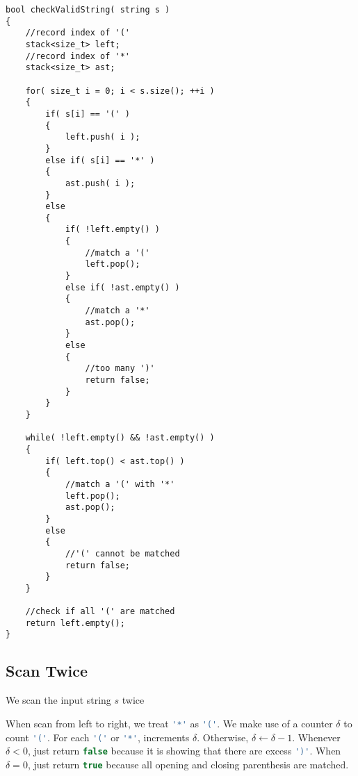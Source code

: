 \begin{lstlisting}[style=customc, caption={Two Stacks}]
bool checkValidString( string s )
{
    //record index of '('
    stack<size_t> left;
    //record index of '*'
    stack<size_t> ast;

    for( size_t i = 0; i < s.size(); ++i )
    {
        if( s[i] == '(' )
        {
            left.push( i );
        }
        else if( s[i] == '*' )
        {
            ast.push( i );
        }
        else
        {
            if( !left.empty() )
            {
                //match a '('
                left.pop();
            }
            else if( !ast.empty() )
            {
                //match a '*'
                ast.pop();
            }
            else
            {
                //too many ')'
                return false;
            }
        }
    }

    while( !left.empty() && !ast.empty() )
    {
        if( left.top() < ast.top() )
        {
            //match a '(' with '*'
            left.pop();
            ast.pop();
        }
        else
        {
            //'(' cannot be matched
            return false;
        }
    }

    //check if all '(' are matched
    return left.empty();
}
\end{lstlisting}

\subsection{Scan Twice}
We scan the input string $s$ twice

When scan from left to right, we treat \lstinline[language=C++, basicstyle=\small\ttfamily, keywordstyle=\bfseries\color{green!40!black}]|'*'| as \lstinline[language=C++, basicstyle=\small\ttfamily, keywordstyle=\bfseries\color{green!40!black}]|'('|. We make use of a counter $\delta$ to count \lstinline[language=C++, basicstyle=\small\ttfamily, keywordstyle=\bfseries\color{green!40!black}]|'('|. For each \lstinline[language=C++, basicstyle=\small\ttfamily, keywordstyle=\bfseries\color{green!40!black}]|'('| or \lstinline[language=C++, basicstyle=\small\ttfamily, keywordstyle=\bfseries\color{green!40!black}]|'*'|, increments $\delta$. Otherwise, $\delta\gets\delta-1$. Whenever $\delta < 0$, just return \lstinline[language=C++, basicstyle=\small\ttfamily, keywordstyle=\bfseries\color{green!40!black}]|false| because it is showing that there are excess \lstinline[language=C++, basicstyle=\small\ttfamily, keywordstyle=\bfseries\color{green!40!black}]|')'|.  When $\delta=0$, just return \lstinline[language=C++, basicstyle=\small\ttfamily, keywordstyle=\bfseries\color{green!40!black}]|true| because all opening and closing parenthesis are matched.

